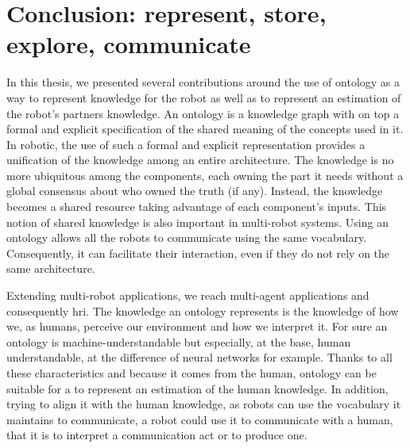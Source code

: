 \chapter*{Conclusion: represent, store, explore, communicate}

%
%
%

In this thesis, we presented several contributions around the use of ontology as a way to represent knowledge for the robot as well as to represent an estimation of the robot's partners knowledge. An ontology is a knowledge graph with on top a formal and explicit specification of the shared meaning of the concepts used in it. In robotic, the use of such a formal and explicit representation provides a unification of the knowledge among an entire architecture. The knowledge is no more ubiquitous among the components, each owning the part it needs without a global consensus about who owned the truth (if any). Instead, the knowledge becomes a shared resource taking advantage of each component's inputs. This notion of shared knowledge is also important in multi-robot systems. Using an ontology allows all the robots to communicate using the same vocabulary. Consequently, it can facilitate their interaction, even if they do not rely on the same architecture.

Extending multi-robot applications, we reach multi-agent applications and consequently \acrfull{hri}. The knowledge an ontology represents is the knowledge of how we, as humans, perceive our environment and how we interpret it. For sure an ontology is machine-understandable but especially, at the base, human understandable, at the difference of neural networks for example. Thanks to all these characteristics and because it comes from the human, ontology can be suitable for a to represent an estimation of the human knowledge. In addition, trying to align it with the human knowledge, as robots can use the vocabulary it maintains to communicate, a robot could use it to communicate with a human, that it is to interpret a communication act or to produce one.

